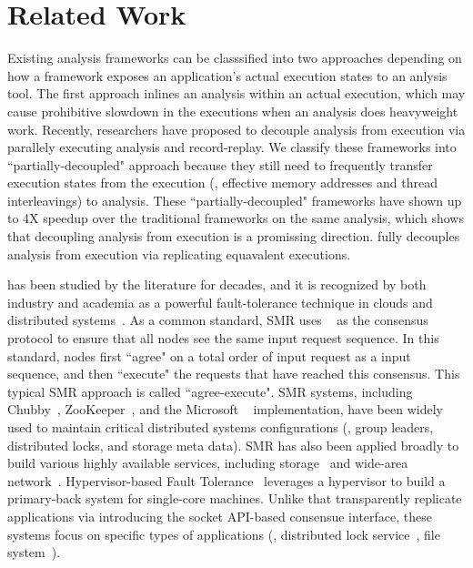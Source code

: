 \section{Related Work} \label{sec:related}

Existing analysis frameworks can be classsified into two approaches depending 
on how a framework exposes an application's actual execution states to an 
anlysis tool. The first approach inlines an analysis within an 
actual execution, which may cause prohibitive slowdown in the executions when 
an analysis does heavyweight work. Recently, researchers have proposed to 
decouple analysis from execution via parallely executing analysis and 
record-replay. We classify these frameworks into ``partially-decoupled" 
approach because they still need to frequently transfer execution states from 
the execution (\eg, effective memory addresses and thread interleavings) to 
analysis. These ``partially-decoupled" frameworks have shown up to 4X speedup 
over the traditional frameworks on the same analysis, which shows that 
decoupling analysis from execution is a promissing direction. \xxx fully 
decouples analysis from execution via replicating equavalent executions.

\smr has been studied by the literature for decades, and it is recognized by 
both industry and academia as a powerful fault-tolerance technique in clouds 
and distributed systems~\cite{lamportclock, smr:tutorial}. As a common 
standard, SMR uses \paxos~\cite{paxos} as the consensus protocol to ensure that 
all nodes see the same input request sequence. In this standard, nodes first 
``agree" on a total order of input request as a input sequence, and then 
``execute" the requests that have reached this consensus. This typical SMR 
approach is called ``agree-execute". SMR systems, including 
Chubby~\cite{chubby:osdi}, ZooKeeper~\cite{zookeeper}, and 
the Microsoft \paxos~\cite{paxos} implementation, have been widely used to 
maintain critical distributed systems configurations (\eg, group leaders, 
distributed locks, and storage meta data). SMR has also been applied broadly to 
build various highly available services, including 
storage~\cite{paxos:datastore} and wide-area network~\cite{mencius:osdi08}. 
Hypervisor-based Fault Tolerance~\cite{hft:sosp95} leverages a hypervisor to 
build a primary-back system for single-core machines. Unlike \xxx that 
transparently replicate applications via introducing the socket API-based 
consensue interface, these systems focus on specific types of applications 
(\eg, distributed lock service~\cite{chubby:osdi}, file 
system~\cite{zookeeper}).

